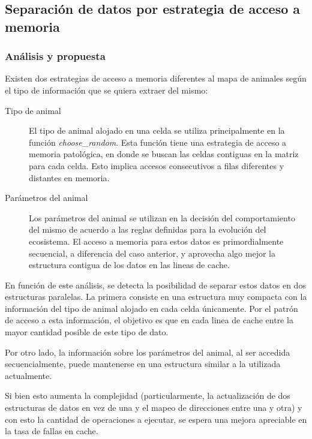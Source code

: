 \documentclass[a4paper,11pt]{article}
\begin{document}
\subsection{Separación de datos por estrategia de acceso a memoria}

\subsubsection{Análisis y propuesta}

Existen dos estrategias de acceso a memoria diferentes al mapa de animales según el tipo de información que se quiera extraer del mismo:

\begin{description}

    \item[Tipo de animal] El tipo de animal alojado en una celda se utiliza
        principalmente en la función \textit{choose\_random}. Esta función
        tiene una estrategia de acceso a memoria patológica, en donde se buscan
        las celdas contiguas en la matriz para cada celda. Esto implica accesos
        consecutivos a filas diferentes y distantes en memoria.

    \item[Parámetros del animal] Los parámetros del animal se utilizan en la
        decisión del comportamiento del mismo de acuerdo a las reglas definidas
        para la evolución del ecosistema. El acceso a memoria para estos datos
        es primordialmente secuencial, a diferencia del caso anterior, y
        aprovecha algo mejor la estructura contigua de los datos en las lineas
        de cache.

\end{description}

En función de este análisis, se detecta la posibilidad de separar estos datos
en dos estructuras paralelas. La primera consiste en una estructura muy
compacta con la información del tipo de animal alojado en cada celda
únicamente. Por el patrón de acceso a esta información, el objetivo es que en
cada linea de cache entre la mayor cantidad posible de este tipo de dato.

Por otro lado, la información sobre los parámetros del animal, al ser accedida
secuencialmente, puede mantenerse en una estructura similar a la
utilizada actualmente.

Si bien esto aumenta la complejidad (particularmente, la actualización de dos
estructuras de datos en vez de una y el mapeo de direcciones entre una y otra)
y con esto la cantidad de operaciones a ejecutar, se espera una mejora
apreciable en la tasa de fallas en cache.
\end{document}
